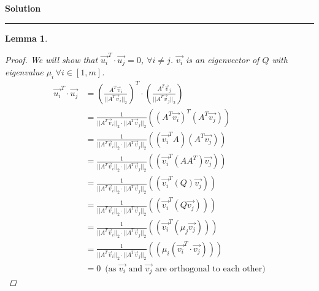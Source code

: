 \documentclass[a4paper,12pt]{article}
\newenvironment{solution}[2][]{%
    \begin{mdframed}[linecolor=blue!70!black, linewidth=2pt, roundcorner=10pt, backgroundcolor=yellow!10!white, skipabove=12pt, skipbelow=12pt]%
        \textbf{\large #2}
        \par\noindent\rule{\textwidth}{0.4pt}
}{
    \end{mdframed}
}
\newtheorem{lemma}{Lemma}
\begin{document}
\begin{solution}{Solution}
\begin{lemma}
\begin{proof}
            We will show that $\vec{u_{i}}^{T} \cdot \vec{u_{j}} = 0$, $\forall i \neq j$. $\vec{v_{i}}$ is an eigenvector
            of $Q$ with eigenvalue $\mu_{i} \, \forall i \in [1,m]$.
            \begin{align*}
              \vec{u_{i}}^{T} \cdot \vec{u_{j}} &= \left(\frac{A^{T} \vec{v}_{i}}{\lvert\lvert A^{T} \vec{v}_{i} \rvert\rvert_{2}}\right)^{T}
              \cdot \left(\frac{A^{T} \vec{v}_{j}}{\lvert\lvert A^{T} \vec{v}_{j} \rvert\rvert_{2}}\right) \\
              &= \frac{1}{\lvert\lvert A^{T} \vec{v}_{i} \rvert\rvert_{2}\cdot  \lvert\lvert A^{T} \vec{v}_{j} \rvert\rvert_{2}} 
              \left( {(A^{T}\vec{v_{i}})}^{T} (A^{T}\vec{v_{j}})\right) \\
              &= \frac{1}{\lvert\lvert A^{T} \vec{v}_{i} \rvert\rvert_{2}\cdot  \lvert\lvert A^{T} \vec{v}_{j} \rvert\rvert_{2}} 
              \left( (\vec{v_{i}}^{T} A) (A^{T}\vec{v_{j}})\right) \\              
              &= \frac{1}{\lvert\lvert A^{T} \vec{v}_{i} \rvert\rvert_{2}\cdot  \lvert\lvert A^{T} \vec{v}_{j} \rvert\rvert_{2}} 
              \left( (\vec{v_{i}}^{T} (AA^{T}) \vec{v_{j}})\right) \\
              &= \frac{1}{\lvert\lvert A^{T} \vec{v}_{i} \rvert\rvert_{2}\cdot  \lvert\lvert A^{T} \vec{v}_{j} \rvert\rvert_{2}} 
              \left( (\vec{v_{i}}^{T} (Q) \vec{v_{j}})\right) \\
              &= \frac{1}{\lvert\lvert A^{T} \vec{v}_{i} \rvert\rvert_{2}\cdot  \lvert\lvert A^{T} \vec{v}_{j} \rvert\rvert_{2}} 
              \left( (\vec{v_{i}}^{T} (Q \vec{v_{j}}))\right) \\
              &= \frac{1}{\lvert\lvert A^{T} \vec{v}_{i} \rvert\rvert_{2}\cdot  \lvert\lvert A^{T} \vec{v}_{j} \rvert\rvert_{2}} 
              \left( (\vec{v_{i}}^{T} (\mu_{j} \vec{v_{j}}) )\right) \\
              &= \frac{1}{\lvert\lvert A^{T} \vec{v}_{i} \rvert\rvert_{2}\cdot  \lvert\lvert A^{T} \vec{v}_{j} \rvert\rvert_{2}} 
              \left( (\mu_{i}(\vec{v_{i}}^{T} \cdot \vec{v_{j}}))\right) \\
              &= 0 \,\text{ (as $\vec{v_{i}}$ and $\vec{v_{j}}$ are orthogonal to each other)}
            \end{align*}


\end{proof}
\end{lemma}
\end{solution}
\end{document}
